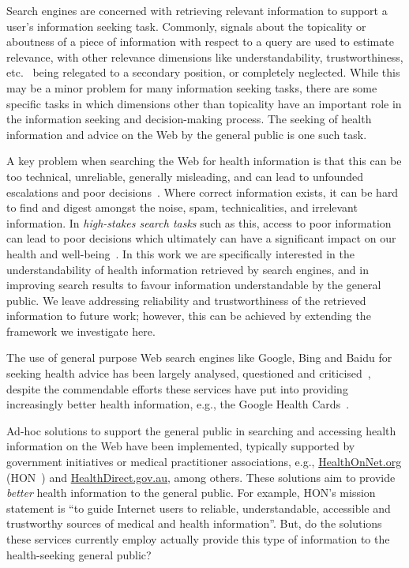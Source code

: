 \documentclass[10pt,a4paper]{article}
\begin{document}
Search engines are concerned with retrieving relevant information to support a user's information seeking task. Commonly, signals about the topicality or aboutness of a piece of information with respect to a query are used to estimate relevance, with other relevance dimensions like understandability, trustworthiness, etc.~\cite{zhang2014multidimensional} being relegated to a secondary position, or completely neglected. While this may be a minor problem for many information seeking tasks, there
are some specific tasks in which dimensions other than topicality have an important role in the information seeking and decision-making process. The seeking of health information and advice on the Web by the general public is one such task. 

A key problem when searching the Web for health information is that this can be too technical, unreliable, generally misleading, and can lead to unfounded escalations and poor decisions~\cite{white09b}. Where correct information exists, it can be hard to find and digest amongst the noise, spam, technicalities, and irrelevant information. In \textit{high-stakes search tasks} such as this, access to poor information can lead to poor decisions which ultimately can have a significant impact on our
health and well-being~\cite{white09b,white13}. In this work we are specifically interested in the understandability of health information retrieved by search engines, and in improving search results to favour information understandable by the general public. We leave addressing reliability and trustworthiness of the retrieved information to future work; however, this can be achieved by extending the framework we investigate here.

The use of general purpose Web search engines like Google, Bing and Baidu for seeking health advice has been largely analysed, questioned and criticised~\cite{graber99,fitzsimmons10,wiener13,patel13,meillier17,ellimoottil12}, despite the commendable efforts these services have put into providing increasingly better health information, e.g., the Google Health Cards~\cite{gabrilovich2016cura}. 

Ad-hoc solutions to support the general public in searching and accessing health information on the Web have been implemented, typically supported by government initiatives or medical practitioner associations, e.g., \url{HealthOnNet.org} (HON~\cite{boyer15}) and \url{HealthDirect.gov.au}, among others. 
These solutions aim to provide \textit{better} health information to the general public. For example, HON's mission statement is ``to guide Internet users to reliable, understandable, accessible and
trustworthy sources of medical and health information''. 
But, do the solutions these services currently employ actually provide this type of information to the health-seeking general public? 
\end{document}
